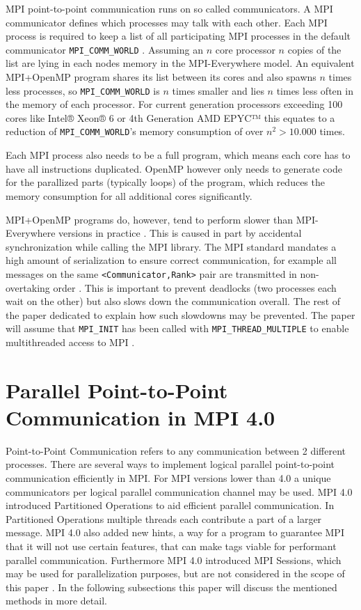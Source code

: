 \documentclass[sigconf]{acmart}
\begin{document}
MPI point-to-point communication runs on so called communicators.
A MPI communicator defines which processes may talk with each other.
Each MPI process is required to keep a list of all participating MPI processes in the default communicator \verb|MPI_COMM_WORLD| \cite{mpi40}.
Assuming an $n$ core processor $n$ copies of the list are lying in each nodes memory in the MPI-Everywhere model.
An equivalent MPI+OpenMP program shares its list between its cores and also spawns $n$ times less processes, so \verb|MPI_COMM_WORLD| is $n$ times smaller and lies $n$ times less often in the memory of each processor.
For current generation processors exceeding 100 cores like Intel® Xeon® 6 \cite{intelXeon6} or 4th Generation AMD EPYC™ \cite{amd4thGenEpyc} this equates to a reduction of \verb|MPI_COMM_WORLD|'s memory consumption of over $n^2 > 10.000$ times.

Each MPI process also needs to be a full program, which means each core has to have all instructions duplicated.
OpenMP however only needs to generate code for the parallized parts (typically loops) of the program, which reduces the memory consumption for all additional cores significantly.

MPI+OpenMP programs do, however, tend to perform slower than MPI-Everywhere versions in practice \cite{zambreLessonsLearned2022}.
This is caused in part by accidental synchronization while calling the MPI library.
The MPI standard mandates a high amount of serialization to ensure correct communication, for example all messages on the same \verb|<Communicator,Rank>| pair are transmitted in non-overtaking order \cite{mpi40}.
This is important to prevent deadlocks (two processes each wait on the other) but also slows down the communication overall.
The rest of the paper dedicated to explain how such slowdowns may be prevented.
The paper will assume that \verb|MPI_INIT| has been called with \verb|MPI_THREAD_MULTIPLE| to enable multithreaded access to MPI \cite{mpi40}.

\section{Parallel Point-to-Point Communication in MPI 4.0}

Point-to-Point Communication refers to any communication between 2 different processes.
There are several ways to implement logical parallel point-to-point communication efficiently in MPI.
For MPI versions lower than 4.0 a unique communicators per logical parallel communication channel may be used.
MPI 4.0 introduced Partitioned Operations to aid efficient parallel communication.
In Partitioned Operations multiple threads each contribute a part of a larger message.
MPI 4.0 also added new hints, a way for a program to guarantee MPI that it will not use certain features, that can make tags viable for performant parallel communication.
Furthermore MPI 4.0 introduced MPI Sessions, which may be used for parallelization purposes, but are not considered in the scope of this paper \cite{MPISessions}.
In the following subsections this paper will discuss the mentioned methods in more detail.
\end{document}
